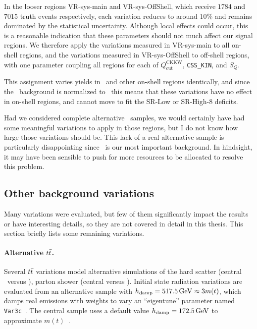 In the looser regions VR-sys-main and VR-sys-OffShell,
which receive $1784$ and $7015$ truth events respectively, each variation
reduces to around $10\%$ and remains dominated by the statistical uncertainty.
Although local effects could occur, this is a reasonable indication that these
parameters should not much affect our signal regions.
We therefore apply the variations measured in VR-sys-main to all on-shell
regions,
and the variations measured in VR-sys-OffShell to off-shell regions,
with one parameter coupling all regions for each of
$Q_\textrm{cut}^\textrm{CKKW}$,
\texttt{CSS\_KIN}, and
$S_Q$.

This assignment varies yields in \crvz\ and other on-shell regions identically,
and since the \diboson\ background is normalized to \crvz\ this means that
these variations have no effect in on-shell regions, and cannot move to
fit the SR-Low or SR-High-8 deficits.

Had we considered complete alternative \diboson\ samples, we would certainly
have had some meaningful variations to apply in those regions, but I do not
know how large those variations should be.
This lack of a real alternative sample is particularly disappointing since
\diboson\ is our most important background.
In hindsight, it may have been sensible to push for more resources to be
allocated to resolve this problem.

\subsection{Other background variations}
\label{sec:2ljets_other_background_variations}
Many variations were evaluated, but few of them significantly impact the
results or have interesting details, so they are not covered in detail in
this thesis.
This section briefly lists some remaining variations.

\paragraph{Alternative $\ttbar$.}
Several $\ttbar$ variations model alternative simulations of the
hard scatter (central \powheg\ versus \amcatnlo),
parton shower (central  versus ).
Initial state radiation variations are evaluated from an alternative
sample with $h_\textrm{damp} = 517.5\,\eV[G] \approx 3m(t)$,
which damps real emissions with weights to vary an ``eigentune'' parameter
named \texttt{Var3c}~\cite{ATL-PHYS-PUB-2014-021}.
The central sample uses a default value $h_\textrm{damp} = 172.5\,\eV[G]$ to
approximate $m(t)$~\cite{CMS-PAS-TOP-16-021}.

